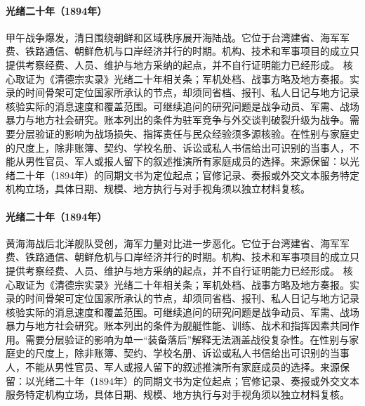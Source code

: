 \hypertarget{public:EQ-1894-FIRST-SINO-JAPANESE-WAR}{}\paragraph{光绪二十年（1894年）}甲午战争爆发，清日围绕朝鲜和区域秩序展开海陆战。它位于台湾建省、海军军费、铁路通信、朝鲜危机与口岸经济并行的时期。机构、技术和军事项目的成立只提供考察经费、人员、维护与地方采纳的起点，并不自行证明能力已经形成。 核心取证为《清德宗实录》光绪二十年相关条；军机处档、战事方略及地方奏报。实录的时间骨架可定位国家所承认的节点，却须同省档、报刊、私人日记与地方记录核验实际的消息速度和覆盖范围。可继续追问的研究问题是战争动员、军需、战场暴力与地方社会研究。账本列出的条件为驻军竞争与外交谈判破裂升级为战争。需要分层验证的影响为战场损失、指挥责任与民众经验须多源核验。在性别与家庭史的尺度上，除非账簿、契约、学校名册、诉讼或私人书信给出可识别的当事人，不能从男性官员、军人或报人留下的叙述推演所有家庭成员的选择。来源保留：以光绪二十年（1894年）的同期文书为定位起点；官修记录、奏报或外交文本服务特定机构立场，具体日期、规模、地方执行与对手视角须以独立材料复核。
\hypertarget{public:EQ-1894-YALU-NAVAL-BATTLE}{}\paragraph{光绪二十年（1894年）}黄海海战后北洋舰队受创，海军力量对比进一步恶化。它位于台湾建省、海军军费、铁路通信、朝鲜危机与口岸经济并行的时期。机构、技术和军事项目的成立只提供考察经费、人员、维护与地方采纳的起点，并不自行证明能力已经形成。 核心取证为《清德宗实录》光绪二十年相关条；军机处档、战事方略及地方奏报。实录的时间骨架可定位国家所承认的节点，却须同省档、报刊、私人日记与地方记录核验实际的消息速度和覆盖范围。可继续追问的研究问题是战争动员、军需、战场暴力与地方社会研究。账本列出的条件为舰艇性能、训练、战术和指挥因素共同作用。需要分层验证的影响为单一“装备落后”解释无法涵盖战役复杂性。在性别与家庭史的尺度上，除非账簿、契约、学校名册、诉讼或私人书信给出可识别的当事人，不能从男性官员、军人或报人留下的叙述推演所有家庭成员的选择。来源保留：以光绪二十年（1894年）的同期文书为定位起点；官修记录、奏报或外交文本服务特定机构立场，具体日期、规模、地方执行与对手视角须以独立材料复核。
